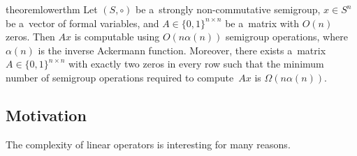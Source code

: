 \documentclass[11pt,letterpaper]{article}
\begin{document}
\begin{restatable}{theorem}{lowerthm}
\label{thm:lowerbound}
Let $(S, \circ)$ be a~strongly non-commutative semigroup, $x \in S^n$ be
a~vector of formal variables, and $A \in \{0,1\}^{n \times n}$
be a~matrix with $O(n)$ zeros. Then $Ax$ is computable
using $O(n\alpha(n))$ semigroup operations, where $\alpha(n)$
is the inverse Ackermann function. Moreover, there exists
a~matrix~$A \in \{0,1\}^{n \times n}$ with exactly two zeros
in every row such that the minimum number of semigroup 
operations
required to compute~$Ax$ is $\Omega(n\alpha(n))$.
\end{restatable}


\subsection{Motivation}
The complexity of linear operators is interesting for many reasons.
\end{document}
